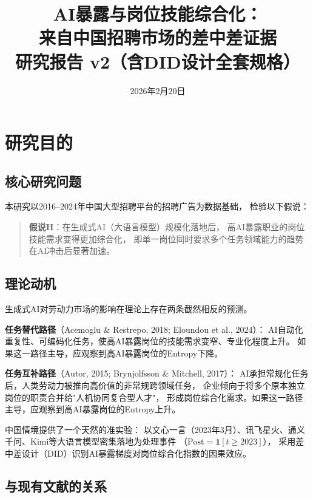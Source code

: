 \documentclass[12pt,a4paper]{ctexart}
\title{\textbf{AI暴露与岗位技能综合化：\\来自中国招聘市场的差中差证据}\\[0.5em]
\large 研究报告 v2（含DID设计全套规格）}
\author{}
\date{2026年2月20日}
\begin{document}
\maketitle
\tableofcontents
\newpage

\section{研究目的}

\subsection{核心研究问题}

本研究以2016--2024年中国大型招聘平台的招聘广告为数据基础，
检验以下假说：

\begin{quote}
\textbf{假说H}：在生成式AI（大语言模型）规模化落地后，
高AI暴露职业的岗位技能需求变得更加综合化，
即单一岗位同时要求多个任务领域能力的趋势在AI冲击后显著加速。
\end{quote}

\subsection{理论动机}

生成式AI对劳动力市场的影响在理论上存在两条截然相反的预测。

\textbf{任务替代路径}（Acemoglu \& Restrepo, 2018; Eloundou et al., 2024）：
AI自动化重复性、可编码化任务，使高AI暴露岗位的技能需求变窄、专业化程度上升。
如果这一路径主导，应观察到高AI暴露岗位的Entropy下降。

\textbf{任务互补路径}（Autor, 2015; Brynjolfsson \& Mitchell, 2017）：
AI承担常规化任务后，人类劳动力被推向高价值的非常规跨领域任务，
企业倾向于将多个原本独立岗位的职责合并给"人机协同复合型人才"，
形成岗位综合化需求。如果这一路径主导，应观察到高AI暴露岗位的Entropy上升。

中国情境提供了一个天然的准实验：
以文心一言（2023年3月）、讯飞星火、通义千问、Kimi等大语言模型密集落地为处理事件
（$\text{Post} = \mathbf{1}[t \geq 2023]$），
采用差中差设计（DID）识别AI暴露梯度对岗位综合化指数的因果效应。

\subsection{与现有文献的关系}
\end{document}
